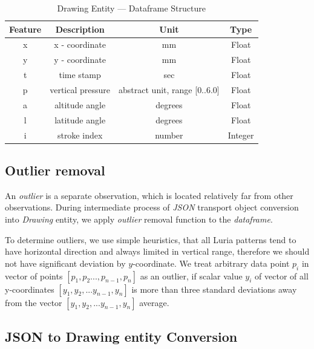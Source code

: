 
\begin{table}[htb]
\centering
\begin{tabular}{c|c|c|c}
\hline
Feature & Description    & Unit                                & Type    \\
\hline
x       & x - coordinate & mm                                  & Float   \\
y       & y - coordinate & mm                                  & Float   \\
t       & time stamp     & sec                                  & Float   \\
p       & vertical pressure       & abstract unit, range {[}0..6.0{]} & Float   \\
a       & altitude angle & degrees                             & Float   \\
l       & latitude angle & degrees                             & Float   \\
i       & stroke index   & number                              & Integer \\
\hline
\end{tabular}
\caption{Drawing Entity --- Dataframe Structure}
\label{dataframe}
\end{table}

\subsection{Outlier removal}

An \textit{outlier} is a separate observation, which is located relatively far from other observations. During intermediate process of \textit{JSON} transport object conversion into \textit{Drawing} entity, we apply \textit{outlier} removal function to the \textit{dataframe}. 

To determine outliers, we use simple heuristics, that all Luria patterns tend to have horizontal direction and always limited in vertical range, therefore we should not have significant deviation by $y$-coordinate. We treat arbitrary data point $p_i$ in vector of points $[p_1, p_2 ..., p_{n-1}, p_n]$ as an outlier, if scalar value $y_i$ of vector of all y-coordinates $[y_1, y_2, ...y_{n-1}, y_n]$ is more than three standard deviations away from the vector $[y_1, y_2, ...y_{n-1}, y_n]$ average.

\subsection{JSON to Drawing entity Conversion}

